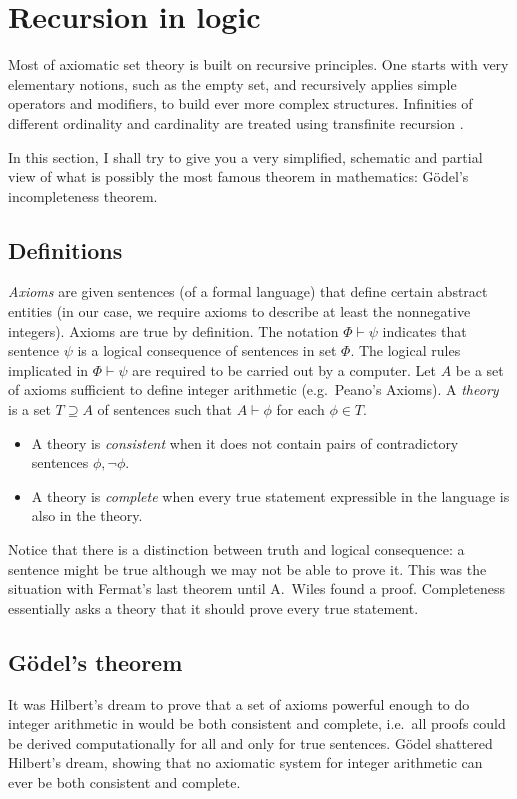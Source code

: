 \documentclass[a4paper]{book}
\theoremstyle{changebreak}                %
\begin{document}
\section{Recursion in logic}
Most of axiomatic set theory is built on recursive principles. One
starts with very elementary notions, such as the empty set, and
recursively applies simple operators and modifiers, to build ever more
complex structures. Infinities of different ordinality and cardinality
are treated using transfinite recursion \cite{kunen}.

In this section, I shall try to give you a very simplified, schematic
and partial view of what is possibly the most famous theorem in
mathematics: G\"odel's incompleteness
theorem.

\subsection{Definitions}
{\it Axioms} are given sentences (of a formal language)
that define certain abstract entities (in our case, we require axioms
to describe at least the nonnegative integers). Axioms are true by
definition. The notation $\Phi\vdash\psi$ indicates that sentence
$\psi$ is a logical consequence of sentences in set $\Phi$. The
logical rules implicated in $\Phi\vdash\psi$ are required to be
carried out by a computer. Let $A$ be a set of axioms sufficient to
define integer arithmetic (e.g.~Peano's
Axioms). A {\it theory} is a set
$T\supseteq A$ of sentences such that $A\vdash\phi$ for each $\phi\in
T$.
\begin{itemize}
\item A theory is {\it consistent} when it
  does not contain pairs of contradictory sentences $\phi,\neg\phi$.
\item A theory is {\it complete} when every
  true statement expressible in the language is also in the theory.
\end{itemize}
Notice that there is a distinction between truth and logical
consequence: a sentence might be true although we may not be able to
prove it. This was the situation with Fermat's last
theorem until A.~Wiles found a proof. Completeness
essentially asks a theory that it should prove every true statement.

\subsection{G\"odel's theorem}
\label{s:recursion:goedel}
It was Hilbert's dream to prove that a set of
axioms powerful enough to do integer arithmetic in would be both
consistent and complete, i.e.~all proofs could be derived
computationally for all and only for true
sentences. G\"odel shattered Hilbert's dream,
showing that no axiomatic system for integer arithmetic can ever be
both consistent and complete.
\end{document}
